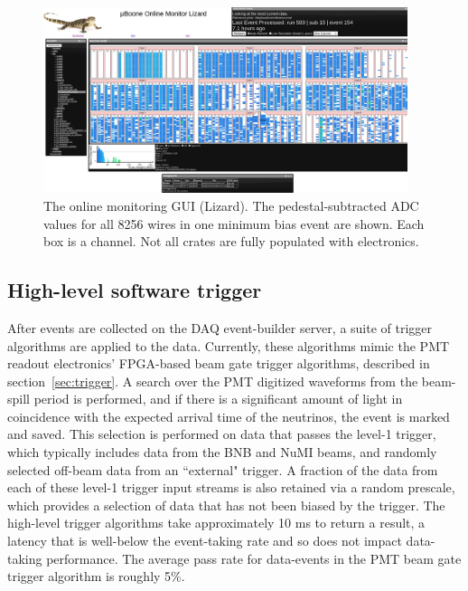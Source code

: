 \begin{figure}
\centering
\includegraphics[width=0.95\textwidth]{./figures/daqLizard.png}
\caption{The online monitoring GUI (Lizard). The pedestal-subtracted ADC values for all 8256 wires in one minimum bias event are shown. Each box is a channel. Not all crates are fully populated with electronics. }
\label{fig:onlinemonitor}
\end{figure}

\subsection{High-level software trigger}
\label{sec:software-trigger}
After events are collected on the DAQ event-builder server, a suite of trigger algorithms are applied to the data. Currently, these algorithms mimic the PMT readout electronics' FPGA-based beam gate trigger algorithms, described in section~\ref{sec:trigger}. A search over the PMT digitized waveforms from the beam-spill period is performed, and if there is a significant amount of light in coincidence with the expected arrival time of the neutrinos, the event is marked and saved. This selection is performed on data that passes the level-1 trigger, which typically includes data from the BNB and NuMI beams, and randomly selected off-beam data from an ``external" trigger. A fraction of the data from each of these level-1 trigger input streams is also retained via a random prescale, which provides a selection of data that has not been biased by the trigger. The high-level trigger algorithms take approximately 10 ms to return a result, a latency that is well-below the event-taking rate and so does not impact data-taking performance. The average pass rate for data-events in the PMT beam gate trigger algorithm is roughly 5\%. 


